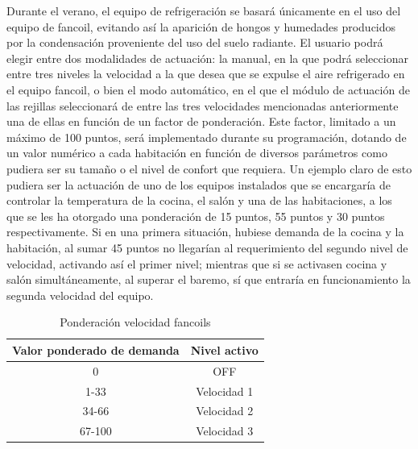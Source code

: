 \begin{itemize}
Durante el verano, el equipo de refrigeración se basará únicamente en el uso del equipo de fancoil, evitando así la aparición de hongos y humedades producidos por la condensación proveniente del uso del suelo radiante. El usuario podrá elegir entre dos modalidades de actuación: la manual, en la que podrá seleccionar entre tres niveles la velocidad a la que desea que se expulse el aire refrigerado en el equipo fancoil, o bien el modo automático, en el que el módulo de actuación de las rejillas seleccionará de entre las tres velocidades mencionadas anteriormente una de ellas en función de un factor de ponderación. Este factor, limitado a un máximo de 100 puntos, será implementado durante su programación, dotando de un valor numérico a cada habitación en función de diversos parámetros como pudiera ser su tamaño o el nivel de confort que requiera. Un ejemplo claro de esto pudiera ser la actuación de uno de los equipos instalados que se encargaría de controlar la temperatura de la cocina, el salón y una de las habitaciones, a los que se les ha otorgado una ponderación de 15 puntos, 55 puntos y 30 puntos respectivamente. Si en una primera situación, hubiese demanda de la cocina y la habitación, al sumar 45 puntos no llegarían al requerimiento del segundo nivel de velocidad, activando así el primer nivel; mientras que si se activasen cocina y salón simultáneamente, al superar el baremo, sí que entraría en funcionamiento la segunda velocidad del equipo.
\bigskip
\begin{table}[H]
\begin{center}
\begin{tabular}{| c | c |} \hline
\rule[0mm]{0mm}{6mm}
\textbf{Valor ponderado de demanda} & \textbf{Nivel activo} \\ \hline
\rule[0mm]{0mm}{3mm}
0 & OFF \\ \hline
\rule[0mm]{0mm}{3mm}
1-33 & Velocidad 1 \\ \hline
\rule[0mm]{0mm}{3mm}
34-66 & Velocidad 2 \\ \hline
\rule[0mm]{0mm}{3mm}
67-100 & Velocidad 3 \\ \hline
\end{tabular}
\caption{Ponderación velocidad fancoils}
\label{tab:vel_fancoils}
\end{center}
\end{table}

\end{itemize}
